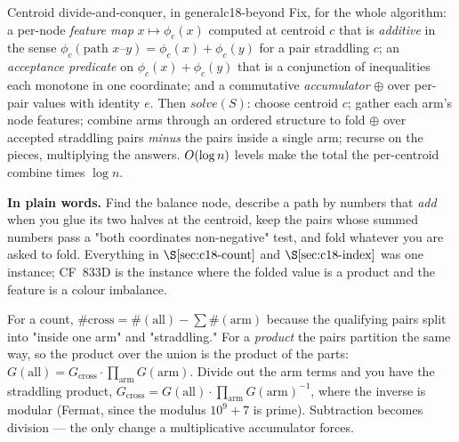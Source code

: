 \begin{definition}{Centroid divide-and-conquer, in general}{c18-beyond}
Fix, for the whole algorithm: a per-node \emph{feature map} \(x\mapsto \phi_c(x)\)
computed at centroid \(c\) that is \emph{additive} in the sense
\(\phi_c(\text{path } x\text{--}y)=\phi_c(x)+\phi_c(y)\) for a pair straddling \(c\); an
\emph{acceptance predicate} on \(\phi_c(x)+\phi_c(y)\) that is a conjunction of
inequalities each monotone in one coordinate; and a commutative \emph{accumulator}
\(\oplus\) over per-pair values with identity \(e\). Then
\(\mathit{solve}(S)\): choose centroid \(c\); gather each arm's node features; combine
arms through an ordered structure to fold \(\oplus\) over accepted straddling pairs
\emph{minus} the pairs inside a single arm; recurse on the pieces, multiplying the
answers. \(O(\log n)\) levels make the total the per-centroid combine times
\(\log n\).
\end{definition}

\noindent\textbf{In plain words.} Find the balance node, describe a path by numbers that
\emph{add} when you glue its two halves at the centroid, keep the pairs whose summed
numbers pass a "both coordinates non-negative" test, and fold whatever you are asked to
fold. Everything in \(\secref{c18-count}\) and \(\secref{c18-index}\) was one instance;
CF~833D is the instance where the folded value is a product and the feature is a colour
imbalance.

\begin{insightbox}
For a count, \(\#\text{cross}=\#(\text{all})-\sum\#(\text{arm})\) because the qualifying
pairs split into "inside one arm" and "straddling." For a \emph{product} the pairs
partition the same way, so the product over the union is the product of the parts:
\(G(\text{all})=G_{\text{cross}}\cdot\prod_{\text{arm}}G(\text{arm})\). Divide out the arm
terms and you have the straddling product,
\(G_{\text{cross}}=G(\text{all})\cdot\prod_{\text{arm}}G(\text{arm})^{-1}\), where the
inverse is modular (Fermat, since the modulus \(10^9{+}7\) is prime). Subtraction becomes
division --- the only change a multiplicative accumulator forces.
\end{insightbox}

